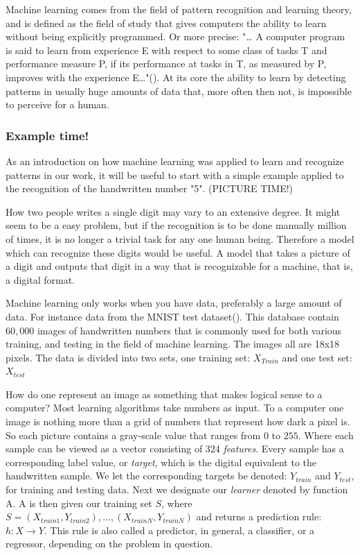 Machine learning comes from the field of pattern recognition and learning theory, and is defined as the field of study that gives computers the ability to learn without being explicitly programmed. Or more precise: "… A computer program is said to learn from experience E with respect to some class of tasks T and performance measure P, if its performance at tasks in T, as measured by P, improves with the experience E…"(\cite{mitchell1997machine}). At its core the ability to learn by detecting patterns in usually huge amounts of data that, more often then not, is impossible to perceive for a human. 


	\subsubsection{Example time!}
	As an introduction on how machine learning was applied to learn and recognize patterns in our work, it will be useful to start with a simple example applied to the recognition of the handwritten number "5". (PICTURE TIME!)
	
	How two people writes a single digit may vary to an extensive degree. It might seem to be a easy problem, but if the recognition is to be done manually million of times, it is no longer a trivial task for any one human being. Therefore a model which can recognize these digits would be useful. A model that takes a picture of a digit and outputs that digit in a way that is recognizable for a machine, that is, a digital format.
	
	Machine learning only works when you have data, preferably a large amount of data. For instance data from the MNIST test dataset(\cite{lecun1998gradient}). This database contain $60,000$ images of handwritten numbers that is commonly used for both various training, and testing in the field of machine learning. The images all are 18x18 pixels. The data is divided into two sets, one training set: $X_{Train}$ and one test set: $X_{test}$
	
	How do one represent an image as something that makes logical sense to a computer? Most learning algorithms take numbers as input. To a computer one image is nothing more than a grid of numbers that represent how dark a pixel is. So each picture contains a gray-scale value that ranges from $0$ to $255$. Where each sample can be viewed as a vector consisting of 324 \textit{features}. Every sample has a corresponding label value, or \textit{target}, which is the digital equivalent to the handwritten sample. We let the corresponding targets be denoted: $Y_{train}$ and $Y_{test}$, for training and testing data. Next we designate our \textit{learner} denoted by function A. A is then given our training set $S$, where $S = (X_{train1}, Y_{train2}),..., (X_{trainN}, Y_{trainN})$ and returns a prediction rule: $h: X \rightarrow Y$. This rule is also called a predictor, in general, a classifier, or a regressor, depending on the problem in question. 
	
